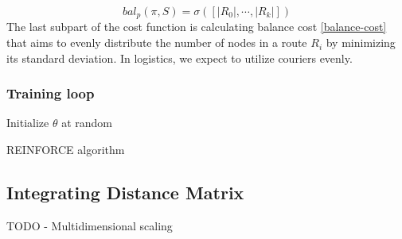         \begin{equation}\label{balance-cost}
            bal_p(\pi, S) = \sigma([|R_0|, \cdots, |R_k|])
        \end{equation}
        The last subpart of the cost function is calculating balance cost \ref{balance-cost} that aims to evenly distribute the number of nodes in a route $R_i$ by minimizing its standard deviation. In logistics, we expect to utilize couriers evenly.
        
        \subsubsection{Training loop}\label{vrptw-loop}
        
        \begin{algorithm}[H]
            
            Initialize $\theta$ at random\;
         \caption{REINFORCE algorithm}
        \end{algorithm}
        
    
    \subsection{Integrating Distance Matrix}
    TODO - Multidimensional scaling
